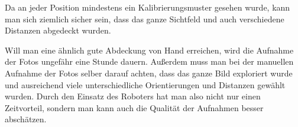 Da an jeder Position mindestens ein Kalibrierungsmuster gesehen wurde, kann man sich ziemlich sicher sein, dass das ganze Sichtfeld und auch verschiedene Distanzen abgedeckt wurden. 

Will man eine ähnlich gute Abdeckung von Hand erreichen, wird die Aufnahme der Fotos ungefähr eine Stunde dauern. Außerdem muss man bei der manuellen Aufnahme der Fotos selber darauf achten, dass das ganze Bild exploriert wurde und ausreichend viele unterschiedliche Orientierungen und Distanzen gewählt wurden. Durch den Einsatz des Roboters hat man also nicht nur einen Zeitvorteil, sondern man kann auch die Qualität der Aufnahmen besser abschätzen.